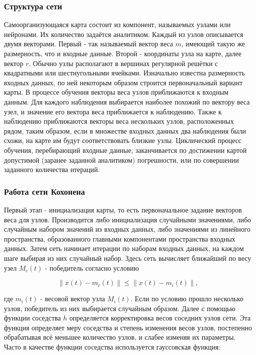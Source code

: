 \documentclass[a4paper,12pt]{report}
\begin{document}
\subsubsection{Структура сети}
Самоорганизующаяся карта состоит из компонент, называемых узлами или нейронами. Их количество задаётся аналитиком. Каждый из узлов описывается двумя векторами. Первый - так называемый вектор веса $m$, имеющий такую же размерность, что и входные данные. Второй - координаты узла на карте, далее вектор $r$. Обычно узлы располагают в вершинах регулярной решётки с квадратными или шестиугольными ячейками.
Изначально известна размерность входных данных, по ней некоторым образом строится первоначальный вариант карты. В процессе обучения векторы веса узлов приближаются к входным данным. Для каждого наблюдения выбирается наиболее похожий по вектору веса узел, и значение его вектора веса приближается к наблюдению. Также к наблюдению приближаются векторы веса нескольких узлов, расположенных рядом, таким образом, если в множестве входных данных два наблюдения были схожи, на карте им будут соответствовать близкие узлы. Циклический процесс обучения, перебирающий входные данные, заканчивается по достижении картой допустимой (заранее заданной аналитиком) погрешности, или по совершении заданного количества итераций.

\subsubsection{Работа сети Кохонена}
Первый этап - инициализация карты, то есть первоначальное задание векторов веса для узлов. Производится либо инициализация случайными значениями, либо случайным набором значений из входных данных, либо значениями из линейного пространства, образованного главными компонентами пространства входных данных. Затем сеть начинает итерации по наборам входных данных, на каждом шаге выбирая из них случайный набор. Здесь сеть вычисляет ближайший по весу узел $M_c(t)$ - победитель согласно условию

\begin{equation}
\| x(t)-m_c(t)\| \leq \| x(t)-m_i(t)\|,
\end{equation}

где $m_i(t)$ - весовой вектор узла $M_i(t)$. Если по условию прошло несколько узлов, победитель из них выбирается случайным образом. Далее с помощью функции соседства $h$ определяется корректировка весов соседних узлов сети. Эта функция определяет меру соседства и степень изменения весов узлов, постепенно обрабатывая всё меньшее количество узлов, и слабее изменяя их параметры. Часто в качестве функции соседства используется гауссовская функция:
\end{document}
